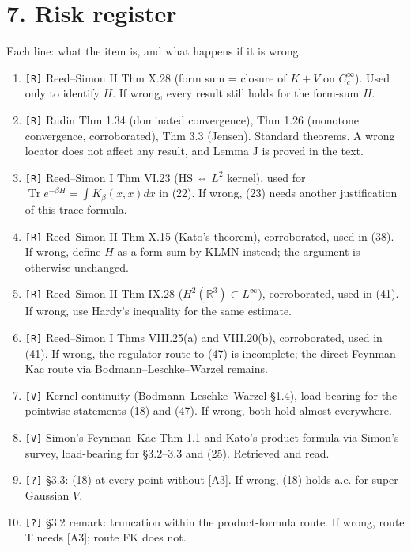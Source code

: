 \documentclass[11pt,a4paper]{article}
\providecommand{\tightlist}{\setlength{\itemsep}{0pt}\setlength{\parskip}{0pt}}
\begin{document}
\hypertarget{risk-register}{%
\section{7. Risk register}\label{risk-register}}

Each line: what the item is, and what happens if it is wrong.

\begin{enumerate}
\def\labelenumi{\arabic{enumi}.}
\tightlist
\item
  \texttt{[R]} Reed--Simon II Thm X.28 (form sum = closure of \(K+V\) on \(C_c^\infty\)). Used only to identify \(H\). If wrong, every result still holds for the form-sum \(H\).
\item
  \texttt{[R]} Rudin Thm 1.34 (dominated convergence), Thm 1.26 (monotone convergence, corroborated), Thm 3.3 (Jensen). Standard theorems. A wrong locator does not affect any result, and Lemma J is proved in the text.
\item
  \texttt{[R]} Reed--Simon I Thm VI.23 (HS ⇔ \(L^2\) kernel), used for \(\operatorname{Tr}e^{-\beta H}=\int K_\beta(x,x)dx\) in (22). If wrong, (23) needs another justification of this trace formula.
\item
  \texttt{[R]} Reed--Simon II Thm X.15 (Kato's theorem), corroborated, used in (38). If wrong, define \(H\) as a form sum by KLMN instead; the argument is otherwise unchanged.
\item
  \texttt{[R]} Reed--Simon II Thm IX.28 (\(H^2(\mathbb R^3)\subset L^\infty\)), corroborated, used in (41). If wrong, use Hardy's inequality for the same estimate.
\item
  \texttt{[R]} Reed--Simon I Thms VIII.25(a) and VIII.20(b), corroborated, used in (41). If wrong, the regulator route to (47) is incomplete; the direct Feynman--Kac route via Bodmann--Leschke--Warzel remains.
\item
  \texttt{[V]} Kernel continuity (Bodmann--Leschke--Warzel §1.4), load-bearing for the pointwise statements (18) and (47). If wrong, both hold almost everywhere.
\item
  \texttt{[V]} Simon's Feynman--Kac Thm 1.1 and Kato's product formula via Simon's survey, load-bearing for §3.2--3.3 and (25). Retrieved and read.
\item
  \texttt{[?]} §3.3: (18) at every point without {[}A3{]}. If wrong, (18) holds a.e. for super-Gaussian \(V\).
\item
  \texttt{[?]} §3.2 remark: truncation within the product-formula route. If wrong, route T needs {[}A3{]}; route FK does not.

\end{enumerate}
\end{document}
